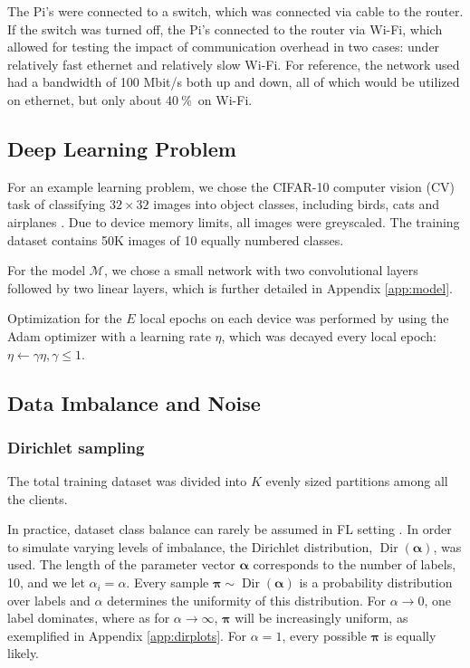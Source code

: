 \documentclass{article}
\newcommand{\unit}[1]{\ensuremath{\:\text{#1}}}
\newcommand{\pro}{\ensuremath{\unit{\%{}}}}
\begin{document}
The Pi's were connected to a switch, which was connected via cable to the router.
If the switch was turned off, the Pi's connected to the router via Wi-Fi, which allowed for testing the impact of communication overhead in two cases: under relatively fast ethernet and relatively slow Wi-Fi.
For reference, the network used had a bandwidth of 100 Mbit/s both up and down, all of which would be utilized on ethernet, but only about 40\pro\ on Wi-Fi.

\subsection{Deep Learning Problem}
For an example learning problem, we chose the CIFAR-10 computer vision (CV) task of classifying $32\times 32$ images into object classes, including birds, cats and airplanes \cite{alex2009learning}.
Due to device memory limits, all images were greyscaled.
The training dataset contains 50K images of 10 equally numbered classes.

For the model $\mathcal M$, we chose a small network with two convolutional layers followed by two linear layers, which is further detailed in Appendix \ref{app:model}.

Optimization for the $E$ local epochs on each device was performed by using the Adam optimizer \cite{kingma2015adam} with a learning rate $\eta$, which was decayed every local epoch: $\eta\leftarrow\gamma\eta, \gamma\le 1$.

\subsection{Data Imbalance and Noise}
\subsubsection{Dirichlet sampling}
The total training dataset was divided into $K$ evenly sized partitions among all the clients.

In practice, dataset class balance can rarely be assumed in FL setting \cite{kai2021advances}.
In order to simulate varying levels of imbalance, the Dirichlet distribution, $\operatorname{Dir}(\bm\alpha)$, was used.
The length of the parameter vector  $\bm\alpha$ corresponds to the number of labels, 10, and we let $\alpha_i=\alpha$.
Every sample $\bm\pi\sim\operatorname{Dir}(\bm\alpha)$ is a probability distribution over labels and $\alpha$ determines the uniformity of this distribution.
For $\alpha\to0$, one label dominates, where as for $\alpha\to\infty$, $\bm\pi$ will be increasingly uniform, as exemplified in Appendix \ref{app:dirplots}.
For $\alpha=1$, every possible $\bm\pi$ is equally likely.
\end{document}
